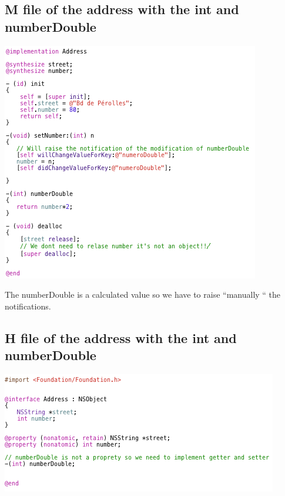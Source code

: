 \documentclass[a4paper,10pt]{article}
\begin{document}
			\subsection{M file of the address with the int and numberDouble}	
				\begin{center}
				\includegraphics[scale=0.8]{./images/srcAddress.png}
				\end{center}
				The numberDouble is a calculated value so we have to raise ``manually `` the notifications.
			\subsection{H file of the address with the int and numberDouble}	
				\begin{center}
				 \includegraphics[scale=0.8]{./images/srcAddressH.png}
				\end{center}
\end{document}
